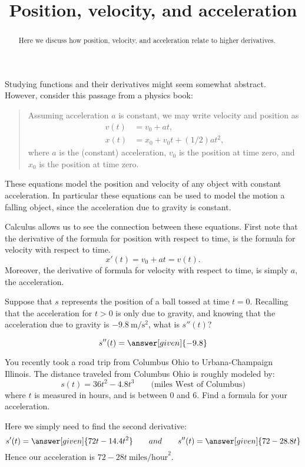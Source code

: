\documentclass{ximera}
\title[Dig-In:]{Position, velocity, and acceleration}
\begin{document}
\begin{abstract}
  Here we discuss how position, velocity, and acceleration relate to
  higher derivatives.
\end{abstract}
\maketitle

Studying functions and their derivatives might seem somewhat
abstract. However, consider this passage from a physics book:
\begin{quote}
  Assuming acceleration $a$ is constant, we may write velocity and
  position as
  \begin{align*}
    v(t) &= v_0 + at,\\
    x(t) &= x_0 + v_0 t + (1/2) a t^2,
  \end{align*}
  where $a$ is the (constant) acceleration, $v_0$ is the position at
  time zero, and $x_0$ is the position at time zero.
\end{quote}
These equations model the position and velocity of any object with
constant acceleration. In particular these equations can be used to
model the motion a falling object, since the acceleration due to
gravity is constant.

Calculus allows us to see the connection between these
equations. First note that the derivative of the formula for position with respect to time, is the formula for velocity with respect to
time.
\[
x'(t) = v_0 + at = v(t).
\]
Moreover, the derivative of formula for velocity with respect to time,
is simply $a$, the acceleration.

\begin{question}
  Suppose that $s$ represents the position of a ball tossed at time
  $t=0$. Recalling that the acceleration for $t>0$ is only due to
  gravity, and knowing that the acceleration due to gravity is
  $-9.8~\mathrm{m}/\mathrm{s}^2$, what is $s''(t)$?
  \begin{prompt}
    \[
  s''(t) = \answer[given]{-9.8}
  \]
  \end{prompt}
\end{question}



\begin{example}
You recently took a road trip from Columbus Ohio to Urbana-Champaign
Illinois. The distance traveled from Columbus Ohio is roughly modeled
by:
\[
s(t) = 36t^2 -4.8t^3 \qquad\text{(miles West of Columbus)}
\]
where $t$ is measured in hours, and is between $0$ and $6$. Find a
formula for your acceleration.
  \begin{explanation}
    Here we simply need to find the second derivative:
    \[
    s'(t) = \answer[given]{72 t- 14.4 t^2} \qquad{and}\qquad s''(t) = \answer[given]{72 - 28.8t}
    \]
    Hence our acceleration is $72-28t~\text{miles/hour}^2$.
  \end{explanation}
\end{example}
\end{document}
